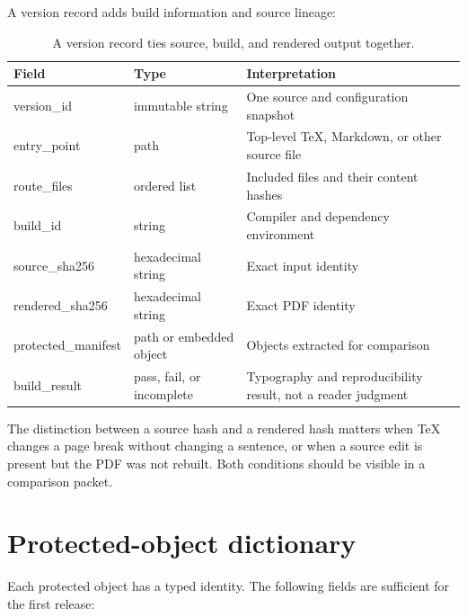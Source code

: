 A version record adds build information and source lineage:

\begin{table}[H]
\centering
\small
\begin{tabularx}{\textwidth}{@{}p{}p{}L@{}}
\toprule
Field & Type & Interpretation \\
\midrule
version\_id & immutable string & One source and configuration snapshot \\
entry\_point & path & Top-level TeX, Markdown, or other source file \\
route\_files & ordered list & Included files and their content hashes \\
build\_id & string & Compiler and dependency environment \\
source\_sha256 & hexadecimal string & Exact input identity \\
rendered\_sha256 & hexadecimal string & Exact PDF identity \\
protected\_manifest & path or embedded object & Objects extracted for comparison \\
build\_result & pass, fail, or incomplete & Typography and reproducibility result,
not a reader judgment \\
\bottomrule
\end{tabularx}
\caption{A version record ties source, build, and rendered output together.}
\label{tab:manual-version-fields}
\end{table}

The distinction between a source hash and a rendered hash matters when TeX
changes a page break without changing a sentence, or when a source edit is
present but the PDF was not rebuilt. Both conditions should be visible in a
comparison packet.

\section{Protected-object dictionary}
\label{sec:manual-object-fields}

Each protected object has a typed identity. The following fields are sufficient
for the first release:

